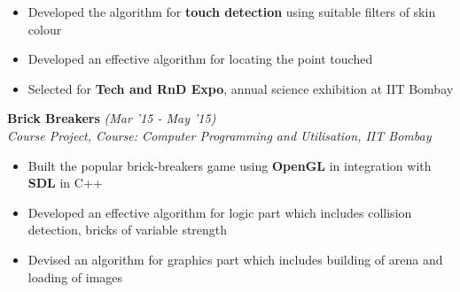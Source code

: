 \documentclass[10.99pt]{article}
\begin{document}
\vspace{-17pt}
\begin{itemize}[itemsep = -0.75 mm, leftmargin=*]%
  \item Developed the algorithm for {\bf touch detection} using suitable filters of skin colour
  \item Developed an effective algorithm for locating the point touched
  \item Selected for {\bf Tech and RnD Expo}, annual science exhibition at IIT Bombay
\end{itemize}
\textbf{Brick Breakers} \hfill{\sl \small (Mar '15 - May '15)}\\
{\it Course Project, Course: Computer Programming and Utilisation, IIT Bombay}\\
\vspace{-17pt} 
\begin{itemize}[itemsep = -0.75 mm, leftmargin=*]
    \item Built the popular brick-breakers game using {\bf OpenGL } in integration with {\bf SDL} in C++
    \item Developed an effective algorithm for logic part which includes collision detection, bricks of variable strength
    \item Devised an algorithm for graphics part which includes building of arena and loading of images 
\end{itemize}
\vspace{-10pt}
\end{document}
